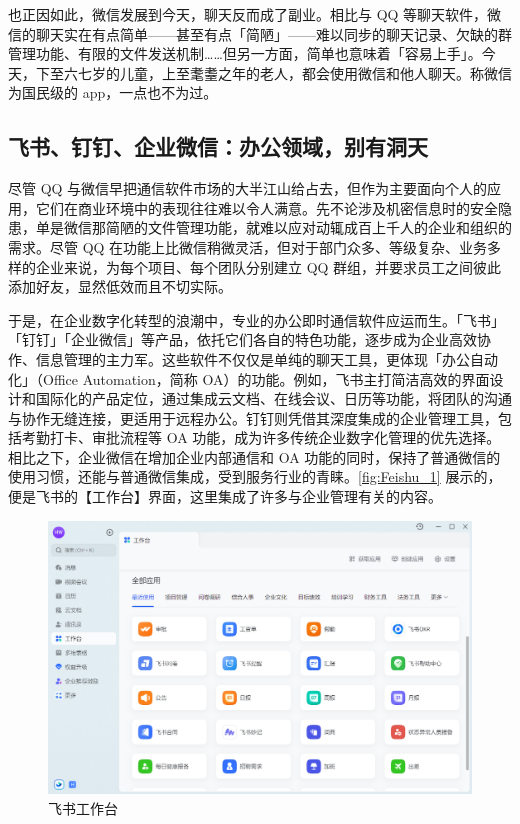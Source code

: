 也正因如此，微信发展到今天，聊天反而成了副业。相比与 QQ 等聊天软件，微信的聊天实在有点简单——甚至有点「简陋」——难以同步的聊天记录、欠缺的群管理功能、有限的文件发送机制……但另一方面，简单也意味着「容易上手」。今天，下至六七岁的儿童，上至耄耋之年的老人，都会使用微信和他人聊天。称微信为国民级的 app，一点也不为过。

\subsection{飞书、钉钉、企业微信：办公领域，别有洞天}

尽管 QQ 与微信早把通信软件市场的大半江山给占去，但作为主要面向个人的应用，它们在商业环境中的表现往往难以令人满意。先不论涉及机密信息时的安全隐患，单是微信那简陋的文件管理功能，就难以应对动辄成百上千人的企业和组织的需求。尽管 QQ 在功能上比微信稍微灵活，但对于部门众多、等级复杂、业务多样的企业来说，为每个项目、每个团队分别建立 QQ 群组，并要求员工之间彼此添加好友，显然低效而且不切实际。

于是，在企业数字化转型的浪潮中，专业的办公即时通信软件应运而生。「飞书」「钉钉」「企业微信」等产品，依托它们各自的特色功能，逐步成为企业高效协作、信息管理的主力军。这些软件不仅仅是单纯的聊天工具，更体现「办公自动化」（Office Automation，简称 OA）的功能。例如，飞书主打简洁高效的界面设计和国际化的产品定位，通过集成云文档、在线会议、日历等功能，将团队的沟通与协作无缝连接，更适用于远程办公。钉钉则凭借其深度集成的企业管理工具，包括考勤打卡、审批流程等 OA 功能，成为许多传统企业数字化管理的优先选择。相比之下，企业微信在增加企业内部通信和 OA 功能的同时，保持了普通微信的使用习惯，还能与普通微信集成，受到服务行业的青睐。\autoref{fig:Feishu_1} 展示的，便是飞书的【工作台】界面，这里集成了许多与企业管理有关的内容。

\begin{figure}[htb!]
  \centering
  \includegraphics[width=.7\textwidth]{assets/software/Feishu_2.png}
  \caption{飞书工作台}
  \label{fig:Feishu_1}
\end{figure}

